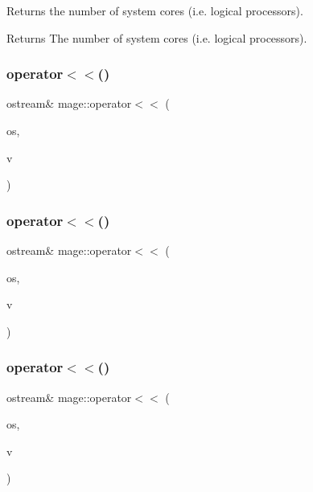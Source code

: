 Returns the number of system cores (i.\+e. logical processors).

\begin{DoxyReturn}{Returns}
The number of system cores (i.\+e. logical processors). 
\end{DoxyReturn}
\hypertarget{namespacemage_ac348ad49bf7e9912aa70cda1b0ca553d}{}\label{namespacemage_ac348ad49bf7e9912aa70cda1b0ca553d} 
\subsubsection{\texorpdfstring{operator$<$$<$()}{operator<<()}\hspace{0.1cm}{\footnotesize\ttfamily [1/3]}}
{\footnotesize\ttfamily ostream\& mage\+::operator$<$$<$ (\begin{DoxyParamCaption}\item[{ostream \&}]{os,  }\item[{const X\+M\+F\+L\+O\+A\+T2 \&}]{v }\end{DoxyParamCaption})}

\hypertarget{namespacemage_a44b2d3046802608544402245919f219b}{}\label{namespacemage_a44b2d3046802608544402245919f219b} 
\subsubsection{\texorpdfstring{operator$<$$<$()}{operator<<()}\hspace{0.1cm}{\footnotesize\ttfamily [2/3]}}
{\footnotesize\ttfamily ostream\& mage\+::operator$<$$<$ (\begin{DoxyParamCaption}\item[{ostream \&}]{os,  }\item[{const X\+M\+F\+L\+O\+A\+T3 \&}]{v }\end{DoxyParamCaption})}

\hypertarget{namespacemage_af6c1d1c5718d611450932bde30d2bfef}{}\label{namespacemage_af6c1d1c5718d611450932bde30d2bfef} 
\subsubsection{\texorpdfstring{operator$<$$<$()}{operator<<()}\hspace{0.1cm}{\footnotesize\ttfamily [3/3]}}
{\footnotesize\ttfamily ostream\& mage\+::operator$<$$<$ (\begin{DoxyParamCaption}\item[{ostream \&}]{os,  }\item[{const X\+M\+F\+L\+O\+A\+T4 \&}]{v }\end{DoxyParamCaption})}

